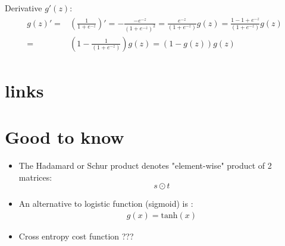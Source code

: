\documentclass[a4paper,12pt]{report}
\begin{document}
\begin{appendices}
Derivative $g'(z)$:
\begin{align}
\begin{split}
g(z)' =& (\frac{1}{1+ e^{-z}})' = -\frac{-e^{-z}}{(1+ e^{-z})^2} = \frac{e^{-z}}{(1+ e^{-z})} g(z) = \frac{1-1+e^{-z}}{(1+ e^{-z})} g(z) \\
 =& (1 - \frac{1}{(1+ e^{-z})}) g(z) = (1 - g(z)) g(z)
\end{split}
\end{align}

\section{links}

\section{Good to know}
\begin{itemize}
\item The Hadamard or Schur product denotes "element-wise" product of 2 matrices:
\begin{equation}
s \odot t
\end{equation}

\item An alternative to logistic function (sigmoid) is :
\begin{align*}
g(x) = \mathrm{tanh}(x)
\end{align*}

\item Cross entropy cost function ???
\end{itemize}

\end{appendices}
\end{document}

